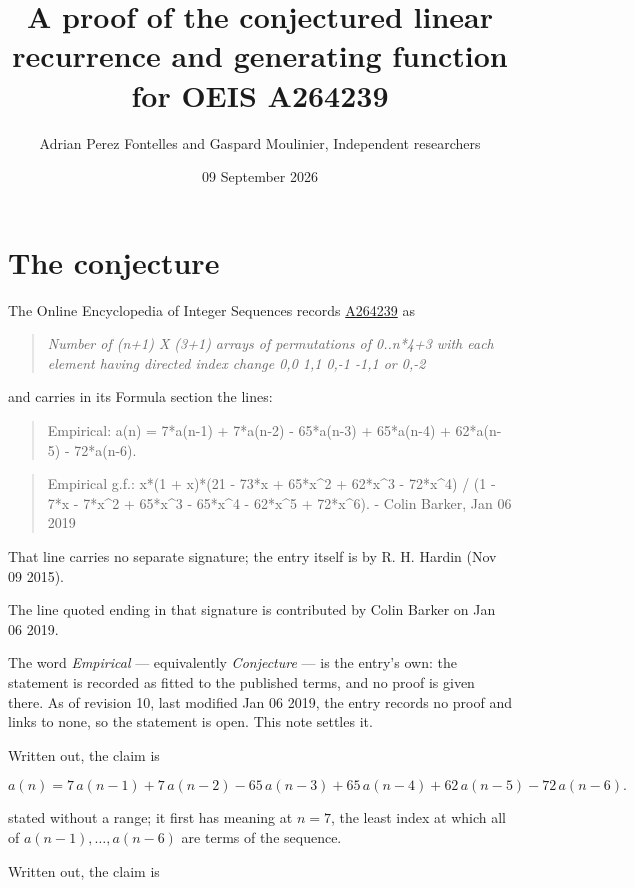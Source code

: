 \documentclass[11pt]{article}
\title{A proof of the conjectured linear recurrence and generating function for OEIS A264239}
\author{Adrian Perez Fontelles and Gaspard Moulinier, Independent researchers}
\date{09 September 2026}
\theoremstyle{definition}
\begin{document}
\maketitle
\section{The conjecture}

The Online Encyclopedia of Integer Sequences records \href{https://oeis.org/A264239}{A264239} as

\begin{quote}\itshape Number of (n+1) X (3+1) arrays of permutations of 0..n*4+3 with each element having directed index change 0,0 1,1 0,-1 -1,1 or 0,-2\end{quote}

and carries in its Formula section the lines:

\begin{quote}\ttfamily Empirical: a(n) = 7*a(n-1) + 7*a(n-2) - 65*a(n-3) + 65*a(n-4) + 62*a(n-5) - 72*a(n-6).\end{quote}

\begin{quote}\ttfamily Empirical g.f.: x*(1 + x)*(21 - 73*x + 65*x\textasciicircum{}2 + 62*x\textasciicircum{}3 - 72*x\textasciicircum{}4) / (1 - 7*x - 7*x\textasciicircum{}2 + 65*x\textasciicircum{}3 - 65*x\textasciicircum{}4 - 62*x\textasciicircum{}5 + 72*x\textasciicircum{}6). - Colin Barker, Jan 06 2019\end{quote}

That line carries no separate signature; the entry itself is by R. H. Hardin (Nov 09 2015).

The line quoted ending in that signature is contributed by Colin Barker on Jan 06 2019.

The word {\itshape Empirical} --- equivalently {\itshape Conjecture} --- is the entry's own: the statement is recorded as fitted to the published terms, and no proof is given there. As of revision 10, last modified Jan 06 2019, the entry records no proof and links to none, so the statement is open. This note settles it.

Written out, the claim is

\[a(n) = 7\,a(n-1) + 7\,a(n-2) - 65\,a(n-3) + 65\,a(n-4) + 62\,a(n-5) - 72\,a(n-6).\]

stated without a range; it first has meaning at $n = 7$, the least index at which all of $a(n-1),\dots,a(n-6)$ are terms of the sequence.

Written out, the claim is
\end{document}
